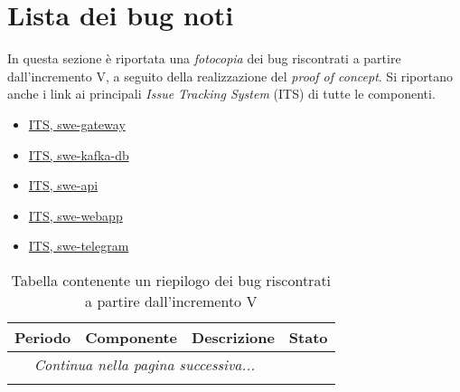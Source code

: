 

\newpage

\appendix
{}

\section{Lista dei bug noti}

In questa sezione è riportata una \textit{fotocopia} dei bug riscontrati a partire dall'incremento V, a seguito della realizzazione del \textit{proof of concept}. Si riportano anche i link ai principali \textit{Issue Tracking System} (ITS) di tutte le componenti.

	\begin{itemize}
		\item \href{https://github.com/RedRoundRobin/swe-gateway/issues}{ITS, swe-gateway}
		\item \href{https://github.com/RedRoundRobin/swe-kafka-db/issues}{ITS, swe-kafka-db}
		\item \href{https://github.com/RedRoundRobin/swe-api/issues}{ITS, swe-api}
		\item \href{https://github.com/RedRoundRobin/swe-webapp/issues}{ITS, swe-webapp}
		\item \href{https://github.com/RedRoundRobin/swe-telegram/issues}{ITS, swe-telegram}
	\end{itemize}

	\begin{center}
		\begin{longtable}{|c|c|p{9.5cm}|c|}
		\hline
		\rowcolor{lighter-grayer}
		\textbf{Periodo} & \textbf{Componente} & \textbf{Descrizione} & \textbf{Stato} \\
		\hline
		\endhead
		\hline
        \multicolumn{3}{|c|}{\textit{Continua nella pagina successiva...}}\\
        \hline
        \endfoot
        \endlastfoot

		\hline






		 \caption{Tabella contenente un riepilogo dei bug riscontrati a partire dall'incremento V}
		\end{longtable}
	\end{center}
		